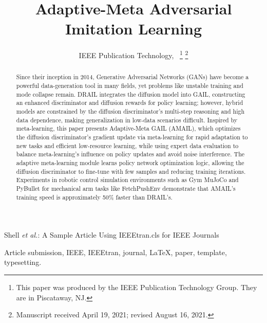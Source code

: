 \documentclass[lettersize,journal]{IEEEtran}
\begin{document}
\title{Adaptive-Meta Adversarial Imitation Learning}

\author{IEEE Publication Technology,~
\thanks{This paper was produced by the IEEE Publication Technology Group. They are in Piscataway, NJ.}%
\thanks{Manuscript received April 19, 2021; revised August 16, 2021.}}

%
{Shell \MakeLowercase{\textit{et al.}}: A Sample Article Using IEEEtran.cls for IEEE Journals}


\maketitle

\begin{abstract}
Since their inception in 2014, Generative Adversarial Networks (GANs) have become a powerful data-generation tool in many fields, yet problems like unstable training and mode collapse remain. DRAIL integrates the diffusion model into GAIL, constructing an enhanced discriminator and diffusion rewards for policy learning; however, hybrid models are constrained by the diffusion discriminator's multi-step reasoning and high data dependence, making generalization in low-data scenarios difficult. Inspired by meta-learning, this paper presents Adaptive-Meta GAIL (AMAIL), which optimizes the diffusion discriminator's gradient update via meta-learning for rapid adaptation to new tasks and efficient low-resource learning, while using expert data evaluation to balance meta-learning's influence on policy updates and avoid noise interference. The adaptive meta-learning module learns policy network optimization logic, allowing the diffusion discriminator to fine-tune with few samples and reducing training iterations. Experiments in robotic control simulation environments such as Gym MuJoCo and PyBullet for mechanical arm tasks like FetchPushEnv demonstrate that AMAIL's training speed is approximately 50\% faster than DRAIL's.
\end{abstract}

\begin{IEEEkeywords}
Article submission, IEEE, IEEEtran, journal, \LaTeX, paper, template, typesetting.
\end{IEEEkeywords}
\end{document}
